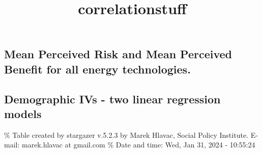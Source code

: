 \documentclass[
]{article}
\title{correlationstuff}
\author{}
\date{\vspace{-2.5em}}
\begin{document}
\maketitle

{
\setcounter{tocdepth}{2}
\tableofcontents
}
\newpage

\hypertarget{mean-perceived-risk-and-mean-perceived-benefit-for-all-energy-technologies.}{%
\subsection{Mean Perceived Risk and Mean Perceived Benefit for all
energy
technologies.}\label{mean-perceived-risk-and-mean-perceived-benefit-for-all-energy-technologies.}}

\newpage

\hypertarget{demographic-ivs---two-linear-regression-models}{%
\subsection{Demographic IVs - two linear regression
models}\label{demographic-ivs---two-linear-regression-models}}

\begingroup\setlength{\tabcolsep}{1pt}\renewcommand{\arraystretch}{0.7}

\% Table created by stargazer v.5.2.3 by Marek Hlavac, Social Policy
Institute. E-mail: marek.hlavac at gmail.com \% Date and time: Wed, Jan
31, 2024 - 10:55:24
\end{document}
